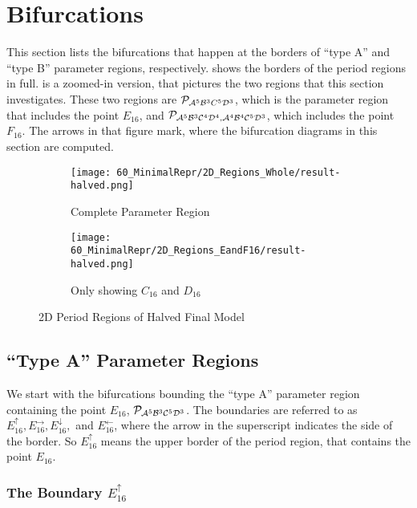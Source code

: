 \section{Bifurcations}

This section lists the bifurcations that happen at the borders of ``type A'' and ``type B'' parameter regions, respectively.
 shows the borders of the period regions in full.
 is a zoomed-in version, that pictures the two regions that this section investigates.
These two regions are $\mathcal{P}_{\mathcal{A}^5\mathcal{B}^3C^5\mathcal{D}^3}$, which is the parameter region that includes the point $E_{16}$, and $\mathcal{P}_{\mathcal{A}^5\mathcal{B}^3\mathcal{C}^4\mathcal{D}^4, \mathcal{A}^4\mathcal{B}^4\mathcal{C}^5\mathcal{D}^3}$, which includes the point $F_{16}$.
The arrows in that figure mark, where the bifurcation diagrams in this section are computed.

\begin{figure}
    \centering
    \begin{subfigure}{0.4\textwidth}
        \centering
        \texttt{[image: 60\_MinimalRepr/2D\_Regions\_Whole/result-halved.png]}
        \caption{Complete Parameter Region}
        \label{fig:final.regions.whole.halved}
    \end{subfigure}
    \begin{subfigure}{0.4\textwidth}
        \centering
        \texttt{[image: 60\_MinimalRepr/2D\_Regions\_EandF16/result-halved.png]}
        \caption{Only showing $C_{16}$ and $D_{16}$}
        \label{fig:final.regions.EandF16.halved}
    \end{subfigure}
    \caption{2D Period Regions of Halved Final Model}
\end{figure}

\subsection{``Type A'' Parameter Regions}

We start with the bifurcations bounding the ``type A'' parameter region containing the point $E_{16}$, $\mathcal{P}_{\mathcal{A}^5\mathcal{B}^3\mathcal{C}^5\mathcal{D}^3}$.
The boundaries are referred to as $E_{16}^\uparrow, E_{16}^\rightarrow, E_{16}^\downarrow,$ and $E_{16}^\leftarrow$, where the arrow in the superscript indicates the side of the border.
So $E_{16}^\uparrow$ means the upper border of the period region, that contains the point $E_{16}$.

\subsubsection{The Boundary $E_{16}^\uparrow$}
\label{sec:final.bifurcation.typeA.up}

